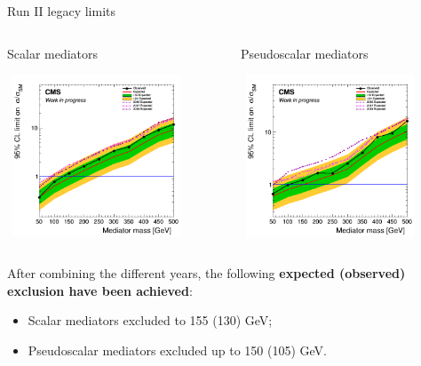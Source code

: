 \documentclass[8pt]{beamer}
\begin{document}
\begin{frame}{Run II legacy limits}
\justifying
\begin{columns}
	\begin{column}{0.5 \textwidth}
\begin{center}
\begin{block}{\centering Scalar mediators}\end{block} \vspace{-10pt}
\includegraphics[width=5.4cm, height=4.8cm]{figs/limit_scalar.png}
\end{center}
\end{column}
	\begin{column}{0.5 \textwidth}
\begin{figure}[htbp]
\begin{center}
\begin{block}{\centering Pseudoscalar mediators}\end{block} \vspace{-8pt}
\includegraphics[width=5.4cm, height=4.8cm]{figs/limit_pseudo.png}
\end{center}
\end{figure}
	\end{column}
	\end{columns} \vfill
	
After combining the different years, the following \textbf{expected (observed) exclusion have been achieved}:
\begin{itemize}
\item Scalar mediators excluded to 155 (130) GeV;
\item Pseudoscalar mediators excluded up to 150 (105) GeV. 
\end{itemize} \vfill
\end{frame}
\end{document}

